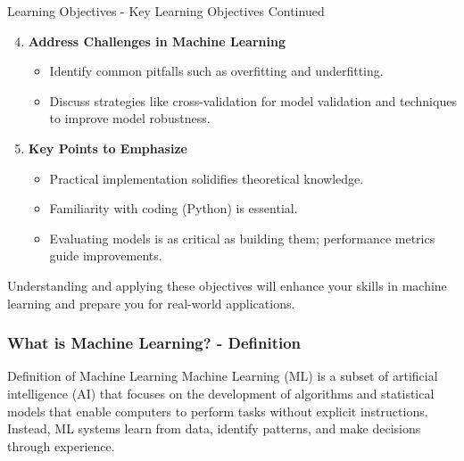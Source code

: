 \documentclass[aspectratio=169]{beamer}
\begin{document}
\begin{frame}[fragile]{Learning Objectives - Key Learning Objectives Continued}
    \begin{enumerate}
        \setcounter{enumi}{3}
        
        \item \textbf{Address Challenges in Machine Learning}
        \begin{itemize}
            \item Identify common pitfalls such as overfitting and underfitting.
            \item Discuss strategies like cross-validation for model validation and techniques to improve model robustness.
        \end{itemize}
        
        \item \textbf{Key Points to Emphasize}
        \begin{itemize}
            \item Practical implementation solidifies theoretical knowledge.
            \item Familiarity with coding (Python) is essential.
            \item Evaluating models is as critical as building them; performance metrics guide improvements.
        \end{itemize}
    \end{enumerate}
    
    Understanding and applying these objectives will enhance your skills in machine learning and prepare you for real-world applications. 
\end{frame}

\begin{frame}[fragile]
    \frametitle{What is Machine Learning? - Definition}
    \begin{block}{Definition of Machine Learning}
        Machine Learning (ML) is a subset of artificial intelligence (AI) that focuses on the development of algorithms and statistical models that enable computers to perform tasks without explicit instructions. Instead, ML systems learn from data, identify patterns, and make decisions through experience.
    \end{block}
\end{frame}
\end{document}
